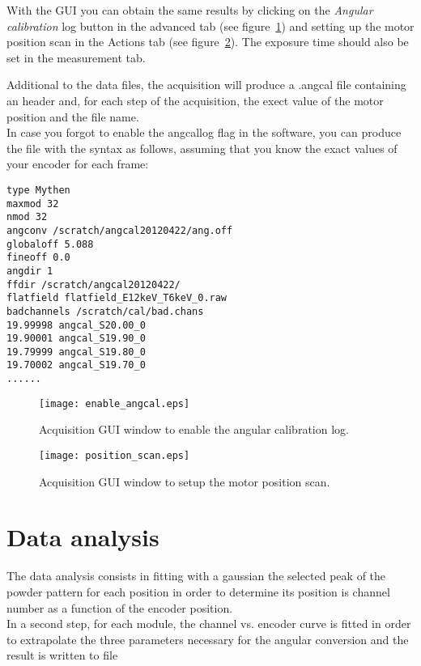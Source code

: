 With the GUI you can obtain the same results by clicking on the \textit{Angular calibration} log button in the advanced tab (see figure~\ref{fig:guiangcallog}) and setting up the motor position scan in the Actions tab (see figure~\ref{fig:guiposscan}). The exposure time should also be set in the measurement tab.



Additional to the data files, the acquisition will produce a .angcal file containing an header and, for each step of the acquisition, the exect value of the motor position and the file name. \\
In case you forgot to enable the angcallog flag in the software, you can produce the file with the syntax as follows, assuming that you know the exact values of your encoder for each frame:
\begin{verbatim}
type Mythen
maxmod 32
nmod 32
angconv /scratch/angcal20120422/ang.off
globaloff 5.088
fineoff 0.0
angdir 1
ffdir /scratch/angcal20120422/
flatfield flatfield_E12keV_T6keV_0.raw
badchannels /scratch/cal/bad.chans
19.99998 angcal_S20.00_0
19.90001 angcal_S19.90_0
19.79999 angcal_S19.80_0
19.70002 angcal_S19.70_0
......
\end{verbatim}



\begin{figure}
\caption{Acquisition GUI window to enable the angular calibration log.} \label{fig:guiangcallog}
\texttt{[image: enable\_angcal.eps]}
\end{figure} 

\begin{figure}
\caption{Acquisition GUI window to setup the motor position scan.} \label{fig:guiposscan}
\texttt{[image: position\_scan.eps]}
\end{figure} 
\newpage

\section{Data analysis}

The data analysis consists in fitting with a gaussian the selected peak of the powder pattern for each position in order to determine its position is channel number as a function of the encoder position. \\
In a second step, for each module, the channel vs. encoder curve is fitted in order to extrapolate the three parameters necessary for the angular conversion and the result is written to file

